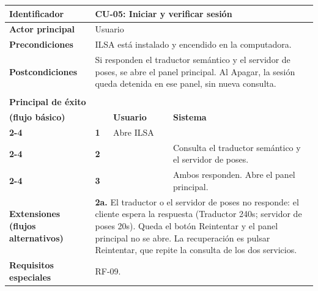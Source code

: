 \begin{table}[h!]
\centering
\renewcommand{\arraystretch}{1.35}
\begin{tabularx}{\textwidth}{|>{\raggedright\arraybackslash\bfseries}p{4cm}|p{0.5cm}|X|X|}
\hline
Identificador & \multicolumn{3}{p{\dimexpr\textwidth-4.5cm-4\tabcolsep\relax}|}{\textbf{CU-05: Iniciar y verificar sesión}} \\ \hline
Actor principal & \multicolumn{3}{p{\dimexpr\textwidth-4.5cm-4\tabcolsep\relax}|}{Usuario} \\ \hline
Precondiciones & \multicolumn{3}{p{\dimexpr\textwidth-4.5cm-4\tabcolsep\relax}|}{ILSA está instalado y encendido en la computadora.} \\ \hline
Postcondiciones & \multicolumn{3}{p{\dimexpr\textwidth-4.5cm-4\tabcolsep\relax}|}{Si responden el traductor semántico y el servidor de poses, se abre el panel principal. Al Apagar, la sesión queda detenida en ese panel, sin nueva consulta.} \\ \hline
\multirow{3}{4cm}{Escenario\\ Principal de éxito\\ (flujo básico)}
 & & \textbf{Usuario} & \textbf{Sistema} \\ \cline{2-4}
 & \textbf{1} & Abre ILSA & \\ \cline{2-4}
 & \textbf{2} & & Consulta el traductor semántico y el servidor de poses. \\ \cline{2-4}
 & \textbf{3} & & Ambos responden. Abre el panel principal. \\ \hline
Extensiones (flujos alternativos) & \multicolumn{3}{p{\dimexpr\textwidth-4.5cm-4\tabcolsep\relax}|}{\textbf{2a.} El traductor o el servidor de poses no responde: el cliente espera la respuesta (Traductor 240s; servidor de poses 20s). Queda el botón Reintentar y el panel principal no se abre. La recuperación es pulsar Reintentar, que repite la consulta de los dos servicios.} \\ \hline
Requisitos especiales & \multicolumn{3}{p{\dimexpr\textwidth-4.5cm-4\tabcolsep\relax}|}{RF-09.} \\ \hline
\end{tabularx}
\end{table}
